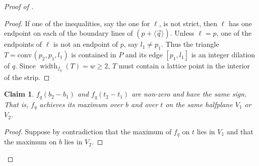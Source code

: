 \documentclass{amsart}
\theoremstyle{plain}
\newtheorem{claim}[theorem]{Claim}
\theoremstyle{definition}
\newcommand{\width}{\operatorname{width}}
\renewcommand{\vec}[1]{\overrightarrow#1}
\newcommand{\vecline}[1]{\langle \vec #1 \rangle}
\newcommand{\conv}{\ensuremath{\mathrm{conv}}\hspace{1pt}}
\begin{document}
\begin{proof}[Proof of ]
\begin{proof}
If one of the inequalities, say the one for $\ell$, is not strict, then $\ell$ has one endpoint on each of the boundary lines of $(p + \vecline q)$. Unless $\ell = p$, one of the endpoints of $\ell$ is not an endpoint of $p$, say $l_1 \neq p_1$. Thus the triangle $T=\conv(p_2, p_1, l_1)$ is contained in $P$ and its edge $[p_1, l_1]$ is an integer dilation of $q$. Since $\width_{f_q}(T) =w \geq 2$, $T$ must contain a lattice point in the interior of the strip.
\end{proof}

%



\begin{claim}
\label{claim:b_and_t}
$f_q(b_2-b_1)$ and $f_q(t_2 - t_1)$ are non-zero and have the same sign. That is, $f_q$ achieves its maximum over $b$ and over $t$ on the same halfplane $V_1$ or $V_2$.
\end{claim}



%

\begin{proof}
Suppose by contradiction that the maximum of $f_q$ on $t$  lies in $V_1$ and that the maximum on $b$ lies in $V_2$. 


\end{proof}
\end{proof}
\end{document}
